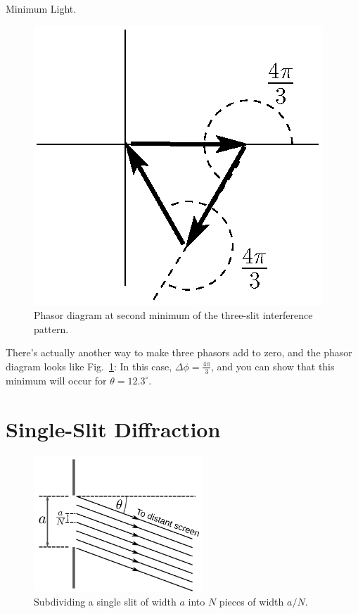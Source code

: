 \begin{exampleb}{Minimum Light.}
\begin{solution}
\begin{figure}
\begin{center}
 \includegraphics[width=2.0truein]{phasors/phasor24}
\caption{\label{fig:phasor24}Phasor diagram at second minimum of the
 three-slit interference pattern.
}
\end{center}
\end{figure}

There's actually another way to make three phasors add to zero, and
the phasor diagram looks like Fig.~\ref{fig:phasor24}:
In this case, $\Delta\phi = \frac{4\pi}{3}$, and you can show that
this minimum will occur for $\theta = 12.3^\circ$.
\end{solution}
\end{exampleb}

\newpage
\section{Single-Slit Diffraction}
\label{sec:single_slit_diffraction}

\begin{figure}[t]
\begin{center}
\includegraphics[width=2.5in]{phasors/singleSlitPhases}
\end{center}
\caption{\label{singleSlitPhases}Subdividing a single
slit of width $a$ into $N$ pieces of width $a/N$.}
\end{figure}


